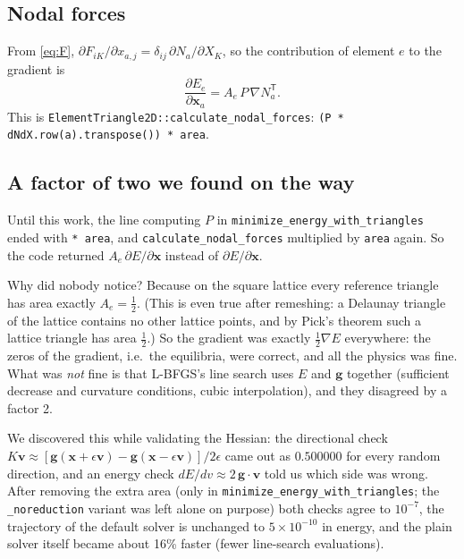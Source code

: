 \documentclass[11pt,a4paper]{article}
\theoremstyle{remark}
\newcommand{\x}{\bm{x}}
\newcommand{\g}{\bm{g}}
\newcommand{\T}{^{\mathsf T}}
\newcommand{\code}[1]{\texttt{#1}}
\begin{document}
\subsection{Nodal forces}

From \eqref{eq:F}, $\partial F_{iK}/\partial x_{a,j} = \delta_{ij}\,\partial N_a/\partial X_K$, so
the contribution of element $e$ to the gradient is
\begin{equation}
\frac{\partial E_e}{\partial \x_a} = A_e\, P\,\nabla N_a\T .
\label{eq:force}
\end{equation}
This is \code{ElementTriangle2D::\allowbreak{}calculate\_\allowbreak{}nodal\_\allowbreak{}forces}: \code{(P * dNdX.row(a).transpose()) * area}.

\subsection{A factor of two we found on the way}
\label{sec:area}

Until this work, the line computing $P$ in \code{minimize\_\allowbreak{}energy\_\allowbreak{}with\_\allowbreak{}triangles} ended
with \code{* area}, and \code{calculate\_\allowbreak{}nodal\_\allowbreak{}forces} multiplied by \code{area} again. So
the code returned $A_e\,\partial E/\partial\x$ instead of $\partial E/\partial\x$.

Why did nobody notice? Because on the square lattice every reference triangle has area
exactly $A_e=\tfrac12$. (This is even true after remeshing: a Delaunay triangle of the
lattice contains no other lattice points, and by Pick's theorem such a lattice triangle
has area $\tfrac12$.) So the gradient was exactly $\tfrac12\nabla E$ everywhere: the zeros
of the gradient, i.e.\ the equilibria, were correct, and all the physics was fine.
What was \emph{not} fine is that L-BFGS's line search uses $E$ and $\g$ together (sufficient
decrease and curvature conditions, cubic interpolation), and they disagreed by a factor 2.

We discovered this while validating the Hessian: the directional check
$K\bm{v}\approx[\g(\x+\epsilon\bm{v})-\g(\x-\epsilon\bm{v})]/2\epsilon$ came out as
$0.500000$ for every random direction, and an energy check $dE/dv \approx 2\,\g\cdot\bm{v}$
told us which side was wrong. After removing the extra area (only in
\code{minimize\_\allowbreak{}energy\_\allowbreak{}with\_\allowbreak{}triangles}; the \code{\_\allowbreak{}noreduction} variant was left alone on
purpose) both checks agree to $10^{-7}$, the trajectory of the default solver is unchanged
to $5\times10^{-10}$ in energy, and the plain solver itself became about 16\% faster (fewer
line-search evaluations).
\end{document}
